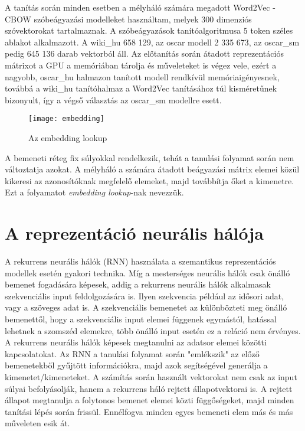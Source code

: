 A tanítás során minden esetben a mélyháló számára megadott Word2Vec - CBOW szóbeágyazási modelleket használtam, melyek 300 dimenziós szóvektorokat tartalmaznak. A szóbeágyazások tanítóalgoritmusa 5 token széles ablakot alkalmazott. A wiki\_hu 658 129, az oscar modell 2 335 673, az oscar\_sm pedig 645 136 darab vektorból áll. Az előtanítás során átadott reprezentációs mátrixot a GPU a memóriában tárolja és műveleteket is végez vele, ezért a nagyobb, oscar\_hu halmazon tanított modell rendkívül memóriaigényesnek, továbbá a wiki\_hu tanítóhalmaz a Word2Vec tanításához túl kisméretűnek bizonyult, így a végső választás az oscar\_sm modellre esett. 

\begin{figure}[H]
	\centering
	\texttt{[image: embedding]}
	\caption{Az embedding lookup}
\end{figure}

A bemeneti réteg fix súlyokkal rendelkezik, tehát a tanulási folyamat során nem változtatja azokat. A mélyháló a számára átadott beágyazási mátrix elemei közül kikeresi az azonosítóknak megfelelő elemeket, majd továbbítja őket a kimenetre. Ezt a folyamatot \textit{embedding lookup}-nak nevezzük.

\section{A reprezentáció neurális hálója}

A rekurrens neurális hálók (RNN) használata a szemantikus reprezentációs modellek esetén gyakori technika. Míg a mesterséges neurális hálók csak önálló bemenet fogadására képesek, addig a rekurrens neurális hálók alkalmasak szekvenciális input feldolgozására is. Ilyen szekvencia például az idősori adat, vagy a szöveges adat is. A szekvenciális bemenetet az különbözteti meg önálló bemenettől, hogy a szekvenciális input elemei függenek egymástól, hatással lehetnek a szomszéd elemekre, több önálló input esetén ez a reláció nem érvényes.
A rekurrens neurális hálók képesek megtanulni az adatsor elemei közötti kapcsolatokat. Az RNN a tanulási folyamat során "emlékszik" az előző bemenetekből gyűjtött információkra, majd azok segítségével generálja a kimenetet/kimeneteket. A számítás során használt vektorokat nem csak az input súlyai befolyásolják, hanem a rekurrens háló rejtett állapotvektorai is. A rejtett állapot megtanulja a folytonos bemenet elemei közti függőségeket, majd minden tanítási lépés során frissül. Ennélfogva minden egyes bemeneti elem más és más műveleten esik át.

